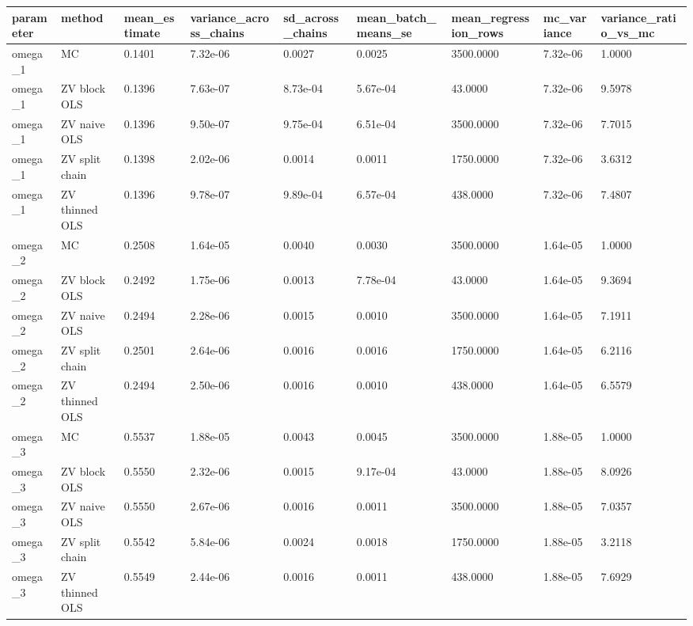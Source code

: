\begin{tabular}{lllllllll}
\toprule
parameter & method & mean\_estimate & variance\_across\_chains & sd\_across\_chains & mean\_batch\_means\_se & mean\_regression\_rows & mc\_variance & variance\_ratio\_vs\_mc \\
\midrule
omega\_1 & MC & 0.1401 & 7.32e-06 & 0.0027 & 0.0025 & 3500.0000 & 7.32e-06 & 1.0000 \\
omega\_1 & ZV block OLS & 0.1396 & 7.63e-07 & 8.73e-04 & 5.67e-04 & 43.0000 & 7.32e-06 & 9.5978 \\
omega\_1 & ZV naive OLS & 0.1396 & 9.50e-07 & 9.75e-04 & 6.51e-04 & 3500.0000 & 7.32e-06 & 7.7015 \\
omega\_1 & ZV split chain & 0.1398 & 2.02e-06 & 0.0014 & 0.0011 & 1750.0000 & 7.32e-06 & 3.6312 \\
omega\_1 & ZV thinned OLS & 0.1396 & 9.78e-07 & 9.89e-04 & 6.57e-04 & 438.0000 & 7.32e-06 & 7.4807 \\
omega\_2 & MC & 0.2508 & 1.64e-05 & 0.0040 & 0.0030 & 3500.0000 & 1.64e-05 & 1.0000 \\
omega\_2 & ZV block OLS & 0.2492 & 1.75e-06 & 0.0013 & 7.78e-04 & 43.0000 & 1.64e-05 & 9.3694 \\
omega\_2 & ZV naive OLS & 0.2494 & 2.28e-06 & 0.0015 & 0.0010 & 3500.0000 & 1.64e-05 & 7.1911 \\
omega\_2 & ZV split chain & 0.2501 & 2.64e-06 & 0.0016 & 0.0016 & 1750.0000 & 1.64e-05 & 6.2116 \\
omega\_2 & ZV thinned OLS & 0.2494 & 2.50e-06 & 0.0016 & 0.0010 & 438.0000 & 1.64e-05 & 6.5579 \\
omega\_3 & MC & 0.5537 & 1.88e-05 & 0.0043 & 0.0045 & 3500.0000 & 1.88e-05 & 1.0000 \\
omega\_3 & ZV block OLS & 0.5550 & 2.32e-06 & 0.0015 & 9.17e-04 & 43.0000 & 1.88e-05 & 8.0926 \\
omega\_3 & ZV naive OLS & 0.5550 & 2.67e-06 & 0.0016 & 0.0011 & 3500.0000 & 1.88e-05 & 7.0357 \\
omega\_3 & ZV split chain & 0.5542 & 5.84e-06 & 0.0024 & 0.0018 & 1750.0000 & 1.88e-05 & 3.2118 \\
omega\_3 & ZV thinned OLS & 0.5549 & 2.44e-06 & 0.0016 & 0.0011 & 438.0000 & 1.88e-05 & 7.6929 \\
\bottomrule
\end{tabular}
